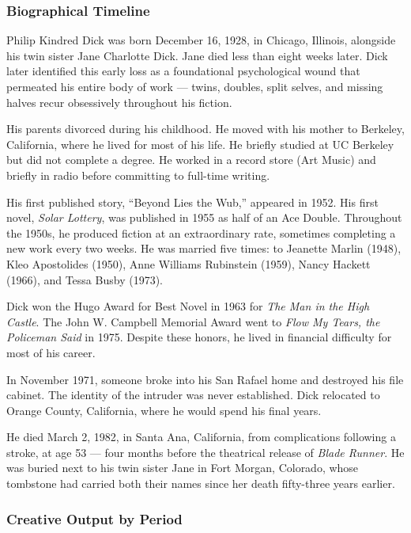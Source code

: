 \documentclass[11pt,letterpaper]{article}
\begin{document}
\subsubsection{Biographical Timeline}

Philip Kindred Dick was born December 16, 1928, in Chicago, Illinois, alongside his twin sister Jane Charlotte Dick. Jane died less than eight weeks later. Dick later identified this early loss as a foundational psychological wound that permeated his entire body of work --- twins, doubles, split selves, and missing halves recur obsessively throughout his fiction.

His parents divorced during his childhood. He moved with his mother to Berkeley, California, where he lived for most of his life. He briefly studied at UC Berkeley but did not complete a degree. He worked in a record store (Art Music) and briefly in radio before committing to full-time writing.

His first published story, ``Beyond Lies the Wub,'' appeared in 1952. His first novel, \textit{Solar Lottery}, was published in 1955 as half of an Ace Double. Throughout the 1950s, he produced fiction at an extraordinary rate, sometimes completing a new work every two weeks. He was married five times: to Jeanette Marlin (1948), Kleo Apostolides (1950), Anne Williams Rubinstein (1959), Nancy Hackett (1966), and Tessa Busby (1973).

Dick won the Hugo Award for Best Novel in 1963 for \textit{The Man in the High Castle}. The John W. Campbell Memorial Award went to \textit{Flow My Tears, the Policeman Said} in 1975. Despite these honors, he lived in financial difficulty for most of his career.

In November 1971, someone broke into his San Rafael home and destroyed his file cabinet. The identity of the intruder was never established. Dick relocated to Orange County, California, where he would spend his final years.

He died March 2, 1982, in Santa Ana, California, from complications following a stroke, at age 53 --- four months before the theatrical release of \textit{Blade Runner}. He was buried next to his twin sister Jane in Fort Morgan, Colorado, whose tombstone had carried both their names since her death fifty-three years earlier.

\subsubsection{Creative Output by Period}
\end{document}
